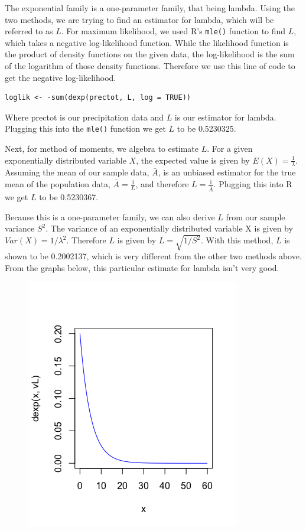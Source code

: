 \documentclass[12pt, a4paper, oneside]{report}
\begin{document}
The exponential family is a one-parameter family, that being lambda. Using the two methods, we are trying to find an estimator for lambda, which will be referred to as \(L\).
For maximum likelihood, we used R's \lstinline{mle()} function to find \(L\), which takes a negative log-likelihood function.
While the likelihood function is the product of density functions on the given data, the log-likelihood is the sum of the logarithm of those density functions.
Therefore we use this line of code to get the negative log-likelihood.

\begin{lstlisting}
loglik <- -sum(dexp(prectot, L, log = TRUE))
\end{lstlisting}

Where prectot is our precipitation data and \(L\) is our estimator for lambda.
Plugging this into the \lstinline{mle()} function we get \(L\) to be 0.5230325.


Next, for method of moments, we algebra to estimate \(L\).
For a given exponentially distributed variable \(X\), the expected value is given by \(E(X) = \frac{1}{\lambda}\). Assuming the mean of our sample data, \(\bar{A}\), is an unbiased estimator for the true mean of the population data, \(\bar{A} = \frac{1}{L}\), and therefore \(L = \frac{1}{\bar{A}}\).
Plugging this into R we get \(L\) to be 0.5230367.


Because this is a one-parameter family, we can also derive \(L\) from our sample variance \(S^2\). The variance of an exponentially distributed variable X is given by \(Var(X) = 1 / \lambda^2\). Therefore \(L\) is given by \(L = \sqrt{1 / S^2}\).
With this method, \(L\) is shown to be 0.2002137, which is very different from the other two methods above. From the graphs below, this particular estimate for lambda isn't very good. 

\begin{figure}[h]
  \centering
  \includegraphics[scale=0.5]{images/vL.png} %
  \caption{}
\end{figure}
\end{document}
